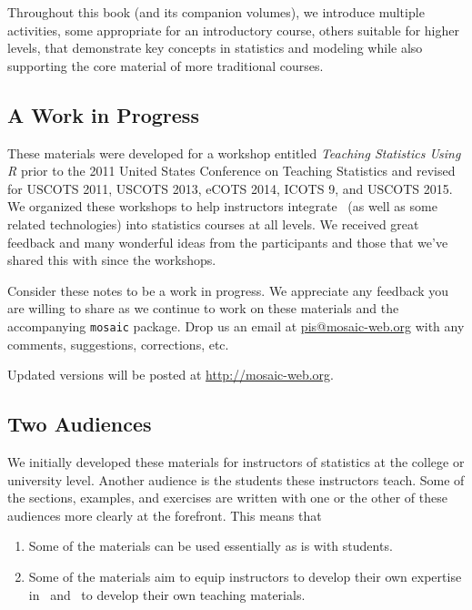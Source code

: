 \documentclass{tufte-book}\usepackage[]{graphicx}\usepackage[]{xcolor}
\renewcommand{\pkg}[1]{{\color{black}\texttt{#1}}}
\begin{document}
Throughout this book (and its companion volumes), we
introduce multiple activities, some
appropriate for an introductory course, others suitable for higher levels, that
demonstrate key concepts in statistics and modeling
while also supporting the core material of more traditional courses.

\subsection*{A Work in Progress}

%

These materials were developed for a workshop entitled 
\emph{Teaching Statistics Using R} prior to the 2011 United States Conference 
on Teaching Statistics and revised for USCOTS 2011, USCOTS 2013, eCOTS 2014, ICOTS 9, and USCOTS 2015.
We organized these workshops to help instructors integrate \R\ (as well as some related technologies) into statistics courses at all levels.
We received great feedback and many wonderful ideas from the participants and those that we've shared this with since the workshops.  

Consider these notes to be a work in progress.  
We appreciate any feedback you are willing to share as we continue
to work on these materials and the accompanying \pkg{mosaic} package.  
Drop us an email at \url{pis@mosaic-web.org} with any comments, suggestions,
corrections, etc.

Updated versions will be posted at \url{http://mosaic-web.org}.


\subsection*{Two Audiences}

We initially developed these materials for
instructors of statistics at the college or
university level.  Another audience is the students these instructors teach.  
Some of the sections, examples, and exercises are written with one or the other of 
these audiences more clearly at the forefront.  This means that 
\begin{enumerate}
\item Some of the materials can be used essentially as is with students.
\item Some of the materials aim to equip instructors to develop their own
expertise in \R\ and \RStudio\ to develop their own teaching materials.
\end{enumerate}
\end{document}
